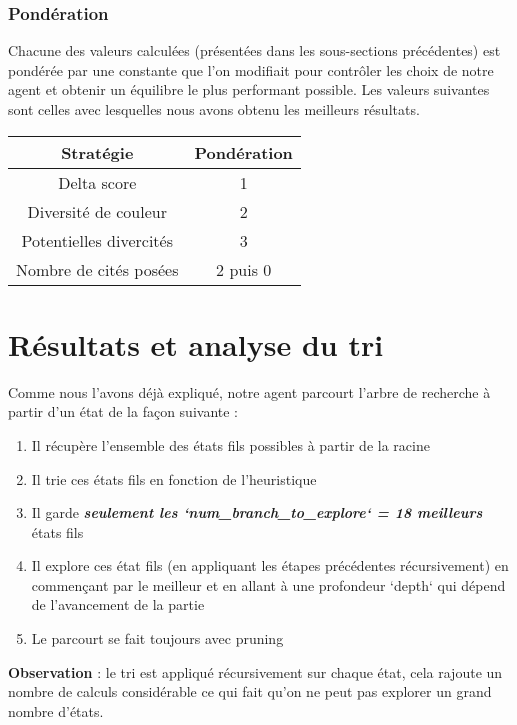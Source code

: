 \documentclass[a4paper,11pt,titlepage,leqno]{article}
\begin{document}
\subsubsection{Pondération}
Chacune des valeurs calculées (présentées dans les sous-sections précédentes) est pondérée par une constante que l'on modifiait pour contrôler les choix de notre agent et obtenir un équilibre le plus performant possible. Les valeurs suivantes sont celles avec lesquelles nous avons obtenu les meilleurs résultats.

\begin{center}
\begin{tabular}{|c|c|}
\hline
\textbf{Stratégie} &\textbf{Pondération} \\
\hline
Delta score & 1 \\
\hline
Diversité de couleur & 2 \\
\hline
Potentielles divercités & 3 \\
\hline
Nombre de cités posées & 2 puis 0 \\
\hline
\end{tabular}
\end{center}

\section{Résultats et analyse du tri}
Comme nous l'avons déjà expliqué, notre agent parcourt l'arbre de recherche à partir d'un état de la façon suivante : 
\begin{enumerate}
    \item Il récupère l'ensemble des états fils possibles à partir de la racine
    \item Il trie ces états fils en fonction de l'heuristique
    \item Il garde \textbf{\textit{seulement les `num\_branch\_to\_explore` = 18 meilleurs}} états fils
    \item Il explore ces état fils (en appliquant les étapes précédentes récursivement) en commençant par le meilleur et en allant à une profondeur `depth` qui dépend de l'avancement de la partie
    \item Le parcourt se fait toujours avec pruning
\end{enumerate}
\textbf{Observation} : le tri est appliqué récursivement sur chaque état, cela rajoute un nombre de calculs considérable ce qui fait qu'on ne peut pas explorer un grand nombre d'états.\\
\end{document}
